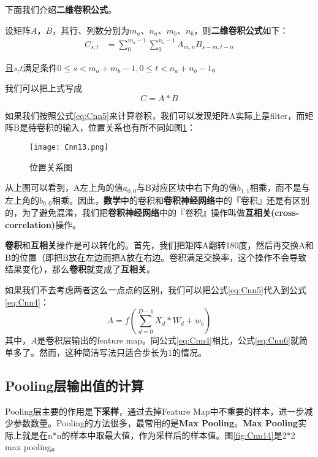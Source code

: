 下面我们介绍\textbf{二维卷积公式}。

设矩阵\(A\)，\(B\)，其行、列数分别为\(m_a\)、\(n_a\)、\(m_b\)、\(n_b\)，则\textbf{二维卷积公式}如下：
\begin{align*}
	C_{s,t} & =\sum_0^{m_a-1}\sum_0^{n_a-1} A_{m,n}B_{s-m,t-n}
\end{align*}

且\(s\),\(t\)满足条件$0 \leqslant {s} < {m_a+m_b-1}, 0 \leqslant {t} < {n_a+n_b-1}$。

我们可以把上式写成
\begin{equation}
	\label{eq:Cnn5}
	C = A * B
\end{equation}

如果我们按照公式\ref{eq:Cnn5}来计算卷积，我们可以发现矩阵A实际上是filter，而矩阵B是待卷积的输入，位置关系也有所不同如图\ref{fig:Cnn13}：
\begin{figure}[htbp]
	\centering
	\texttt{[image: Cnn13.png]}
	\caption{位置关系图}
	\label{fig:Cnn13}
\end{figure}


从上图可以看到，A左上角的值\(a_{0,0}\)与B对应区块中右下角的值\(b_{1,1}\)相乘，而不是与左上角的\(b_{0,0}\)相乘。因此，\textbf{数学}中的卷积和\textbf{卷积神经网络}中的『卷积』还是有区别的，为了避免混淆，我们把\textbf{卷积神经网络}中的『卷积』操作叫做\textbf{互相关(cross-correlation)}操作。

\textbf{卷积}和\textbf{互相关}操作是可以转化的。首先，我们把矩阵A翻转180度，然后再交换A和B的位置（即把B放在左边而把A放在右边。卷积满足交换率，这个操作不会导致结果变化），那么\textbf{卷积}就变成了\textbf{互相关}。

如果我们不去考虑两者这么一点点的区别，我们可以把公式\ref{eq:Cnn5}代入到公式\ref{eq:Cnn4}：
\begin{equation}
	\label{eq:Cnn6}
	A=f(\sum_{d=0}^{D-1}X_d*W_d+w_b)
\end{equation}
其中，\(A\)是卷积层输出的feature map。同公式\ref{eq:Cnn4}相比，公式\ref{eq:Cnn6}就简单多了。然而，这种简洁写法只适合步长为1的情况。


\subsection{Pooling层输出值的计算}\label{Cnn:6}

Pooling层主要的作用是\textbf{下采样}，通过去掉Feature Map中不重要的样本，进一步减少参数数量。Pooling的方法很多，最常用的是\textbf{Max Pooling}。\textbf{Max Pooling}实际上就是在n*n的样本中取最大值，作为采样后的样本值。图\ref{fig:Cnn14}是2*2 max pooling。

